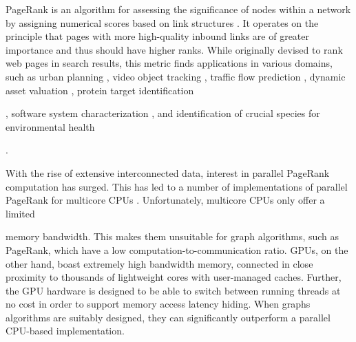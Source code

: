 PageRank is an algorithm for assessing the significance of nodes within a network by assigning numerical scores based on link structures \cite{rank-page99}. It operates on the principle that pages with more high-quality inbound links are of greater importance and thus should have higher ranks. While originally devised to rank web pages in search results, this metric finds applications in various domains, such as urban planning \cite{urban-zhang18}, video object tracking \cite{gong2013pagerank}, traffic flow prediction \cite{traffic-kim15}, dynamic asset valuation \cite{sawilla2006abstracting}, protein target identification \cite{banky2013equal}, software system characterization \cite{chepelianskii2010towards}, and identification of crucial species for environmental health \cite{allesina2009googling}.

With the rise of extensive interconnected data, interest in parallel PageRank computation has surged. This has led to a number of implementations of parallel PageRank for multicore CPUs \cite{rank-garg16, rank-beamer17, rank-lakhotia18, grutzmacher2020acceleration, huang2020accelerating, chen2021hipa}. Unfortunately, multicore CPUs only offer a limited memory bandwidth. This makes them unsuitable for graph algorithms, such as PageRank, which have a low computation-to-communication ratio. GPUs, on the other hand, boast extremely high bandwidth memory, connected in close proximity to thousands of lightweight cores with user-managed caches. Further, the GPU hardware is designed to be able to switch between running threads at no cost in order to support memory access latency hiding. When graphs algorithms are suitably designed, they can significantly outperform a parallel CPU-based implementation.

